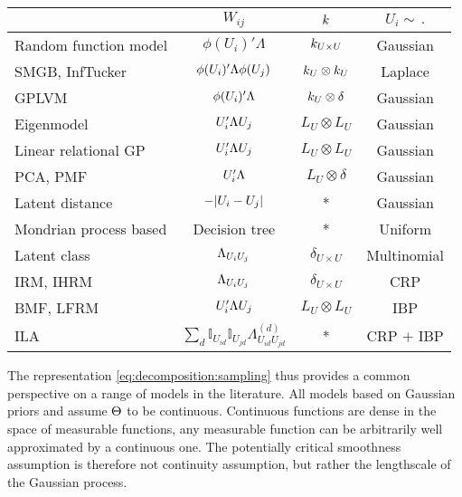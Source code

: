 \begin{table}
      \begin{tabular}{l|ccc}
      & $W_{ij}$ & $k$ & $U_i \sim \, .$ \\%
      \midrule
      Random function model & $\phi(U_i)'\Lambda$ & $k_{U\times U}$ & Gaussian\\%
      SMGB, InfTucker & $\phi(U_i)'\Lambda\phi(U_j)$ & $k_U \otimes k_U$ & Laplace \\%
      GPLVM & $\phi(U_i)'\Lambda$ & $k_U \otimes \delta$ & Gaussian \\%
      Eigenmodel & $U_i'\Lambda U_j$ & $L_U \otimes L_U$ & Gaussian \\%
      Linear relational GP & $U_i'\Lambda U_j$ & $L_U \otimes L_U$ & Gaussian \\%
      PCA, PMF & $U_i'\Lambda$ & $L_U \otimes \delta$ & Gaussian \\%
      Latent distance & $-|U_i - U_j|$ & * & Gaussian \\%
      Mondrian process based & Decision tree & * & Uniform \\%
      \midrule
      Latent class & $\Lambda_{U_iU_j}$ & $\delta_{U\times U}$ & Multinomial \\%
      IRM, IHRM &$\Lambda_{U_iU_j}$ & $\delta_{U\times U}$ & CRP \\%
      BMF, LFRM  & $U_i'\Lambda U_j$ & $L_U \otimes L_U$ & IBP \\%
      ILA & $\sum_d \mathbb{I}_{U_{id}}\mathbb{I}_{U_{jd}}\Lambda^{(d)}_{U_{id}U_{jd}}$ & * & CRP $+$ IBP \\%
    \end{tabular}
\end{table}

The representation \eqref{eq:decomposition:sampling} 
thus provides a common perspective on a range of models in the literature. All models based 
on Gaussian priors and assume $\Theta$ to be continuous.
Continuous functions are dense in the space of measurable functions, \ie any measurable function can be arbitrarily well approximated 
by a continuous one. The potentially critical smoothness assumption is therefore not continuity assumption, but rather the 
lengthscale of the Gaussian process.


